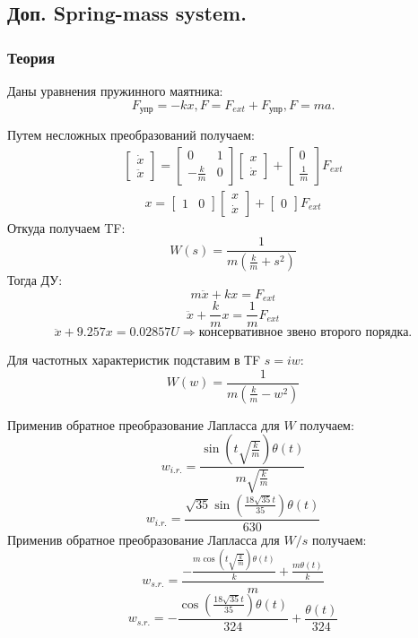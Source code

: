 \documentclass[16pt]{article}
\begin{document}
\newpage
\subsection{Доп. Spring-mass system.}

\subsubsection{Теория}
Даны уравнения пружинного маятника:
\[F_\text{упр} = -kx, F = F_{ext} + F_\text{упр}, F = ma.\]

Путем несложных преобразований получаем:
\begin{align}
    \begin{bmatrix}
        \dot{x} \\
        \ddot{x}
    \end{bmatrix}
    = 
    \begin{bmatrix}
        0 & 1\\
        -\frac{k}{m} & 0
    \end{bmatrix}
    \begin{bmatrix}
        x \\
        \dot{x}
    \end{bmatrix}
    + 
    \begin{bmatrix}
        0 \\
        \frac{1}{m}
    \end{bmatrix}
    F_{ext}
\end{align}
\begin{align}
    x
    = 
    \begin{bmatrix}
        1 & 0
    \end{bmatrix}
    \begin{bmatrix}
        x \\
        \dot{x}
    \end{bmatrix}
    + 
    \begin{bmatrix}
        0
    \end{bmatrix}
    F_{ext}
\end{align}
Откуда получаем TF:
\[
    W(s) = \frac{1}{m \left(\frac{k}{m} + s^{2}\right)}
\]
Тогда ДУ:
\[
    m\ddot{x} + kx = F_{ext}
\]
\[
    \ddot{x} + \frac{k}{m}x = \frac{1}{m}F_{ext}
\]
\[
    \ddot{x} + 9.257x = 0.02857U \Rightarrow \text{консервативное звено второго порядка}.
\]

Для частотных характеристик подставим в ТF \(s = iw\):
\[
    W(w) = \frac{1}{m \left(\frac{k}{m} - w^{2}\right)}
\]

Применив обратное преобразование Лапласса для \(W\) получаем:
\[w_{i.r.} = \frac{\sin{\left(t \sqrt{\frac{k}{m}} \right)} \theta\left(t\right)}{m \sqrt{\frac{k}{m}}}\]
\[w_{i.r.} = \frac{\sqrt{35} \sin{\left(\frac{18 \sqrt{35} t}{35} \right)} \theta\left(t\right)}{630}\]
Применив обратное преобразование Лапласса для \(W / s\) получаем:
\[w_{s.r.} = \frac{- \frac{m \cos{\left(t \sqrt{\frac{k}{m}} \right)} \theta\left(t\right)}{k} + \frac{m \theta\left(t\right)}{k}}{m}\]
\[w_{s.r.} =  - \frac{\cos{\left(\frac{18 \sqrt{35} t}{35} \right)} \theta\left(t\right)}{324} + \frac{\theta\left(t\right)}{324}\]
\end{document}
